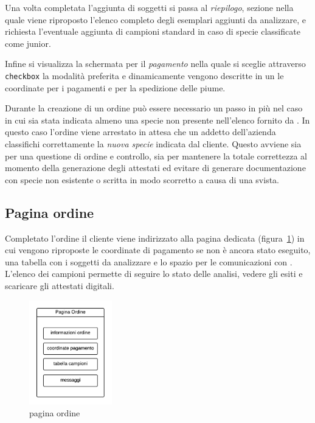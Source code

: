 Una volta completata l'aggiunta di soggetti si passa al \emph{riepilogo}, sezione nella quale viene riproposto l'elenco completo degli esemplari aggiunti da analizzare, e richiesta l'eventuale aggiunta di campioni standard in caso di specie classificate come junior.

Infine si visualizza la schermata per il \emph{pagamento} nella quale si sceglie attraverso \texttt{checkbox} la modalità preferita e dinamicamente vengono descritte in un  le coordinate per i pagamenti e per la spedizione delle piume.

Durante la creazione di un ordine può essere necessario un passo in più nel caso in cui sia stata indicata almeno una specie non presente nell'elenco fornito da {\fem}. In questo caso l'ordine viene arrestato in attesa che un addetto dell'azienda classifichi correttamente la \emph{nuova specie} indicata dal cliente. Questo avviene sia per una questione di ordine e controllo, sia per mantenere la totale correttezza al momento della generazione degli attestati ed evitare di generare documentazione con specie non esistente o scritta in modo scorretto a causa di una svista.

\subsection*{Pagina ordine}
\label{subs:po}
Completato l'ordine il cliente viene indirizzato alla pagina dedicata (figura~\ref{fig:pagina-ordine-s}) in cui vengono riproposte le coordinate di pagamento se non è ancora stato eseguito, una tabella con i soggetti da analizzare e lo spazio per le comunicazioni con {\fem}. L'elenco dei campioni permette di seguire lo stato delle analisi, vedere gli esiti e  scaricare gli attestati digitali.

\begin{figure}
 \centering
 \includegraphics[width=0.32\textwidth]{images/pagina-ordine-s} 
 \caption{pagina ordine}
 \label{fig:pagina-ordine-s}
\end{figure}

